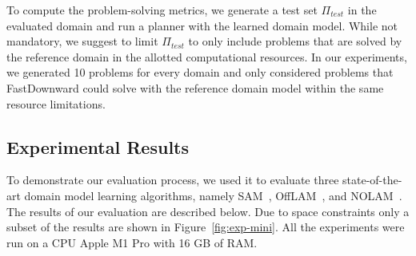 \documentclass{article}
\theoremstyle{definition}
\theoremstyle{remark}
\newcommand{\stest}{\ensuremath{S_{\textit{test}}}\xspace}
\newcommand{\ptest}{\ensuremath{\Pi_{\textit{test}}}\xspace}
\newcommand{\nolam}{NOLAM\xspace}
\newcommand{\offlam}{OffLAM\xspace}
\newcommand{\T}{T}
\newcommand{\Ttrain}{\T_{train}}
\newcommand{\Ttest}{\T_{test}}
\newcommand{\samshort}{SAM}
\newif\ifaddcomments
\newcommand{\roni}[1]{\ifaddcomments{\textcolor{red}{[Roni: #1]}}\fi}
\newcommand{\leo}[1]{\ifaddcomments{\textcolor{pink}{[Leonardo: #1]}}\fi}
\begin{document}
%
To compute the problem-solving metrics, we generate a test set \ptest in the evaluated domain and run a planner with the learned domain model. 
While not mandatory, we suggest to limit \ptest to only include problems that are solved by the reference domain in the allotted computational resources. 
In our experiments, we generated 10 problems for every domain and only considered problems that FastDownward could solve with the reference domain model within the same resource limitations.\roni{What were our time/memory limitations?}





%


\subsection{Experimental Results}


\roni{Writing standard: we show here 3 concrete algorithms, not 3 approaches.}

To demonstrate our evaluation process, we used it to evaluate three state-of-the-art domain model learning algorithms, namely \samshort~\citep{juba2021safe}, \offlam~\citep{LAMANNA2025104256}, and \nolam~\citep{Lamanna24}. The results of our evaluation  are described below. Due to space constraints only a subset of the results are shown in Figure~\ref{fig:exp-mini}. All the experiments were run on a CPU Apple M1 Pro with 16 GB of RAM.
\end{document}
